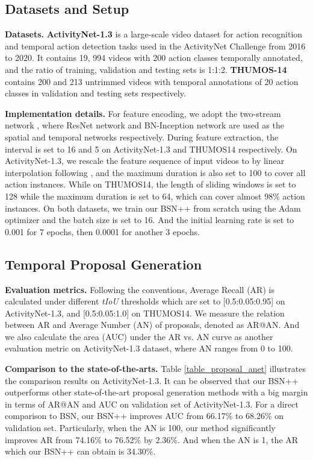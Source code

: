 \documentclass[letterpaper]{article} \usepackage{aaai21}  \usepackage{times}  \usepackage{helvet} \usepackage{courier}  \usepackage[hyphens]{url}  \usepackage{graphicx} \urlstyle{rm} \def\UrlFont{\rm}  \usepackage{natbib}  \usepackage{amsmath,amssymb} \usepackage{caption} \frenchspacing  \usepackage{color}
\begin{document}
\subsection{Datasets and Setup}

\textbf{Datasets.} \textbf{ActivityNet-1.3} \cite{Anet} is a large-scale video dataset for action recognition and temporal action detection tasks used in the ActivityNet Challenge from 2016 to 2020. It contains 19, 994 videos with 200 action classes temporally annotated, and the ratio of training, validation and testing sets is 1:1:2. \textbf{THUMOS-14} \cite{Jiang} contains 200 and 213 untrimmed videos with temporal annotations of 20 action classes in validation and testing sets respectively.


\noindent
\textbf{Implementation details.} For feature encoding, we adopt the two-stream network \cite{K.Simonyan}, where ResNet network \cite{K.He} and BN-Inception network \cite{S.Ioffe} are used as the spatial and temporal networks respectively. During feature extraction, the interval  is set to 16 and 5 on ActivityNet-1.3 and THUMOS14 respectively. On ActivityNet-1.3, we rescale the feature sequence of input videos to  by linear interpolation following \cite{BSN}, and the maximum duration  is also set to 100 to cover all action instances. While on THUMOS14, the length  of sliding windows is set to 128 while the maximum duration  is set to 64, which can cover almost 98\% action instances. On both datasets, we train our BSN++ from scratch using the Adam optimizer and the batch size is set to 16. And the initial learning rate is set to 0.001 for 7 epochs, then 0.0001 for another 3 epochs.



\subsection{Temporal Proposal Generation} 

\textbf{Evaluation metrics.} Following the conventions, 
Average Recall (AR) is calculated under different \textit{tIoU} thresholds which are set to [0.5:0.05:0.95] on ActivityNet-1.3, and [0.5:0.05:1.0] on THUMOS14. We measure the relation between AR and Average Number (AN) of proposals, denoted as AR@AN. And we also calculate the area (AUC) under the AR vs. AN curve as another evaluation metric on ActivityNet-1.3 dataset, where AN ranges from 0 to 100.




\noindent
\textbf{Comparison to the state-of-the-arts.} Table \ref{table_proposal_anet} illustrates the comparison results on ActivityNet-1.3. It can be observed that our BSN++ outperforms other state-of-the-art proposal generation methods with a big margin in terms of AR@AN and AUC on validation set of ActivityNet-1.3. For a direct comparison to BSN, our BSN++ improves AUC from 66.17\% to 68.26\% on validation set. Particularly, when the AN is 100, our method significantly improves AR from 74.16\% to 76.52\% by 2.36\%. And when the AN is 1, the AR which our BSN++ can obtain is 34.30\%.
\end{document}
